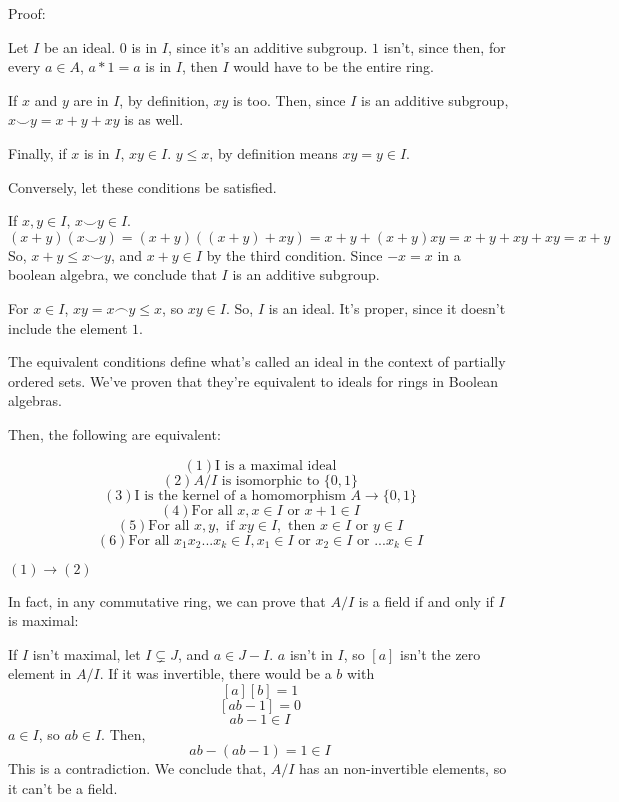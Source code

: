 \documentclass{article}
\begin{document}
      Proof:
      
      Let $I$ be an ideal. $0$ is in $I$, since it's an additive subgroup. $1$
      isn't, since then, for every $a \in A$, $a*1 = a$ is in $I$, then $I$
      would have to be the entire ring.

      If $x$ and $y$ are in $I$, by definition, $xy$ is too. Then, since $I$ is
      an additive subgroup, $x \smile y = x + y + xy$ is as well.

      Finally, if $x$ is in $I$, $xy \in I$. $y \leq x$, by definition means
      $xy = y \in I$.

      Conversely, let these conditions be satisfied.

      If $x, y \in I$, $x \smile y \in I$.
      \[(x+y)(x \smile y) = (x+y)((x+y)+xy) = x + y + (x+y)xy = x + y + xy + xy =
      x + y\]
      So, $x+y \leq x \smile y$, and $x+y \in I$ by the third condition. Since
      $-x = x$ in a boolean algebra, we conclude that $I$ is an additive
      subgroup.

      For $x \in I$, $xy = x \frown y \leq x$, so $xy \in I$. So, $I$ is an
      ideal. It's proper, since it doesn't include the element $1$.

      The equivalent conditions define what's called an ideal in the context of
      partially ordered sets. We've proven that they're equivalent to ideals for
      rings in Boolean algebras.

      Then, the following are equivalent:

      \[(1) \text{I is a maximal ideal}\]
      \[(2) A/I \text{ is isomorphic to } \{0,1\}\]
      \[(3) \text{I is the kernel of a homomorphism } A \rightarrow \{0,1\}\]
      \[(4) \text{For all } x, x \in I \text{ or } x+1 \in I\]
      \[(5) \text{For all } x,y, \text{ if } xy \in I, \text{ then } x \in I
      \text{ or } y \in I\]
      \[(6) \text{For all } x_1x_2...x_k \in I, x_1 \in I \text{ or } x_2 \in I
      \text{ or } ... x_k \in I\]

      $(1) \rightarrow (2)$

      In fact, in any commutative ring, we can prove that $A/I$ is a field if
      and only if $I$ is maximal:

      If $I$ isn't maximal, let $I \subsetneq J$, and $a \in J - I$. $a$ isn't
      in $I$, so $[a]$ isn't the zero element in $A/I$. If it was invertible,
      there would be a $b$ with
      \[[a][b] = 1\]
      \[[ab - 1] = 0\]
      \[ab - 1 \in I\]
      $a \in I$, so $ab \in I$. Then,
      \[ab - (ab - 1) = 1 \in I\]
      This is a contradiction. We conclude that, $A/I$ has an non-invertible
      elements, so it can't be a field.
\end{document}
